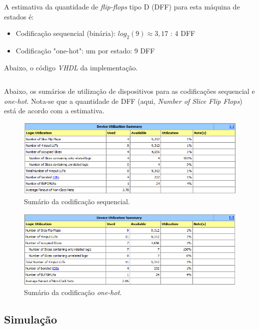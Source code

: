 \documentclass[12pt]{article}
\begin{document}
A estimativa da quantidade de \emph{flip-flops} tipo D (DFF) para esta máquina de estados é:
\begin{itemize}  
\item Codificação sequencial (binária): \begin{math}log_{2}(9)\approx 3,17\end{math} : 4 DFF
\item Codificação "one-hot": um por estado: 9 DFF
\end{itemize}

Abaixo, o código \emph{VHDL} da implementação.

\inputminted{vhdl}{sequence_detector.vhd}

Abaixo, os sumários de utilização de dispositivos para as codificações sequencial e \emph{one-hot}. Nota-se que a quantidade de DFF (aqui, \emph{Number of Slice Flip Flops}) está de acordo com a estimativa.

\begin{figure}[!h]
    \centering
    \includegraphics[width=1.0\textwidth]{lab8_sequence_detector_dff_seq.png}
    \caption{Sumário da codificação sequencial.}
\end{figure}

\begin{figure}[!h]
    \centering
    \includegraphics[width=1.0\textwidth]{lab8_sequence_detector_dff_onehot.png}
    \caption{Sumário da codificação \emph{one-hot}.}
\end{figure}

\subsection{Simulação}
\end{document}
